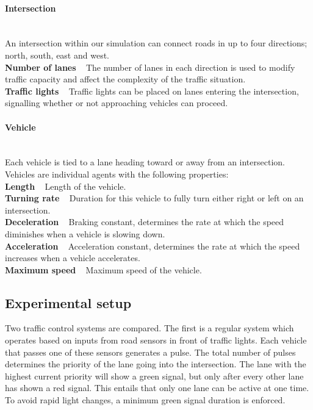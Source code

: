 \documentclass{article}
\begin{document}
\paragraph{Intersection} ~\\
An intersection within our simulation can connect roads in up to four directions; north, south, east and west. \\
\textbf{Number of lanes} ~ The number of lanes in each direction is used to modify traffic capacity and affect the complexity of the traffic situation.\\
\textbf{Traffic lights} ~ Traffic lights can be placed on lanes entering the intersection, signalling whether or not approaching vehicles can proceed.

\paragraph{Vehicle} ~\\
Each vehicle is tied to a lane heading toward or away from an intersection. Vehicles are individual agents with the following properties:\\
\textbf{Length} ~ Length of the vehicle.\\
\textbf{Turning rate} ~ Duration for this vehicle to fully turn either right or left on an intersection.\\
\textbf{Deceleration} ~ Braking constant, determines the rate at which the speed diminishes when a vehicle is slowing down.\\
\textbf{Acceleration} ~ Acceleration constant, determines the rate at which the speed increases when a vehicle accelerates.\\
\textbf{Maximum speed} ~ Maximum speed of the vehicle.\\

\subsection{Experimental setup}
\label{exp_setup}
Two traffic control systems are compared. The first is a regular system which operates based on inputs from road sensors in front of traffic lights. Each vehicle that passes one of these sensors generates a pulse. The total number of pulses determines the priority of the lane going into the intersection. The lane with the highest current priority will show a green signal, but only after every other lane has shown a red signal. This entails that only one lane can be active at one time. To avoid rapid light changes, a minimum green signal duration is enforced.
\end{document}
